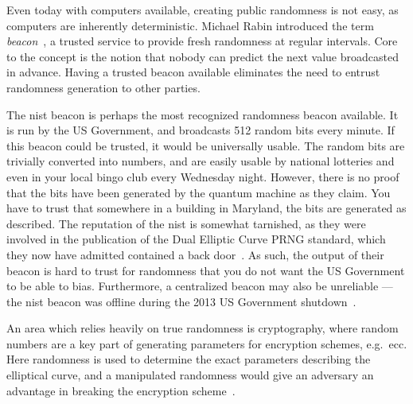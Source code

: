 Even today with computers available, creating public randomness is not easy, as computers are inherently deterministic. Michael Rabin introduced the term \emph{beacon}~\cite{rabin1983transaction}, a trusted service to provide fresh randomness at regular intervals. Core to the concept is the notion that nobody can predict the next value broadcasted in advance. Having a trusted beacon available eliminates the need to entrust randomness generation to other parties.

The \gls{nist} beacon is perhaps the most recognized randomness beacon available.
It is run by the US Government, and broadcasts 512 random bits every minute.
If this beacon could be trusted, it would be universally usable. The random bits are trivially converted into numbers, and are easily usable by national lotteries and even in your local bingo club every Wednesday night.
However, there is no proof that the bits have been generated by the quantum machine as they claim. You have to trust that somewhere in a building in Maryland, the bits are generated as described.
The reputation of the \gls{nist} is somewhat tarnished, as they were involved in the publication of the Dual Elliptic Curve PRNG standard, which they now have admitted contained a back door~\cite{nist2014backdoor}. As such, the output of their beacon is hard to trust for randomness that you do not want the US Government to be able to bias.
Furthermore, a centralized beacon may also be unreliable --- the \gls{nist} beacon was offline during the 2013 US Government shutdown~\cite{bonneau2015bitcoin}.

An area which relies heavily on true randomness is cryptography, where random numbers are a key part of generating parameters for encryption schemes, e.g.\ \gls{ecc}.
Here randomness is used to determine the exact parameters describing the elliptical curve, and a manipulated randomness would give an adversary an advantage in breaking the encryption scheme~\cite{bernstein2015manipulate}.


